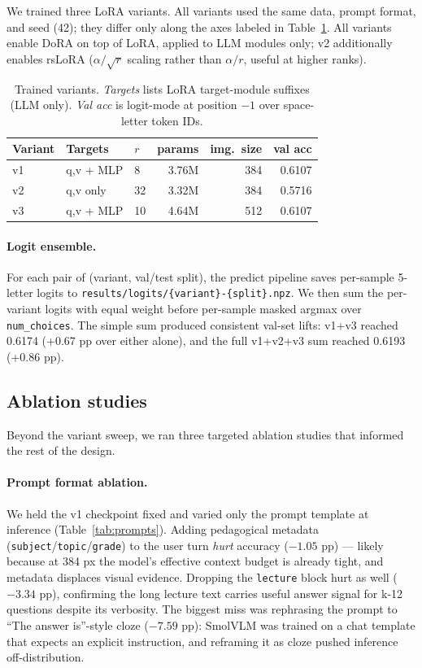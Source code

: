\documentclass[11pt]{article}
\begin{document}
We trained three LoRA variants. All variants used the same data, prompt format, and seed (42); they differ only along the axes labeled in Table~\ref{tab:variants}. All variants enable DoRA on top of LoRA, applied to LLM modules only; v2 additionally enables rsLoRA ($\alpha/\sqrt{r}$ scaling rather than $\alpha/r$, useful at higher ranks).

\begin{table}[h]
\centering
\small
\begin{tabular}{lllrrr}
\toprule
Variant & Targets & $r$ & params & img.\ size & val acc \\
\midrule
v1 & q,v + MLP & 8  & 3.76M & 384 & 0.6107 \\
v2 & q,v only  & 32 & 3.32M & 384 & 0.5716 \\
v3 & q,v + MLP & 10 & 4.64M & 512 & 0.6107 \\
\bottomrule
\end{tabular}
\caption{Trained variants. \textit{Targets} lists LoRA target-module suffixes (LLM only). \textit{Val acc} is logit-mode at position $-1$ over space-letter token IDs.}
\label{tab:variants}
\end{table}

\paragraph{Logit ensemble.} For each pair of (variant, val/test split), the predict pipeline saves per-sample 5-letter logits to \texttt{results/logits/}\allowbreak\texttt{\{variant\}-\{split\}.npz}. We then sum the per-variant logits with equal weight before per-sample masked argmax over \texttt{num\_choices}. The simple sum produced consistent val-set lifts: v1+v3 reached 0.6174 (+0.67 pp over either alone), and the full v1+v2+v3 sum reached 0.6193 (+0.86 pp).

\subsection{Ablation studies}
\label{sec:ablations}

Beyond the variant sweep, we ran three targeted ablation studies that informed the rest of the design.

\paragraph{Prompt format ablation.} We held the v1 checkpoint fixed and varied only the prompt template at inference (Table~\ref{tab:prompts}). Adding pedagogical metadata (\texttt{subject}/\texttt{topic}/\texttt{grade}) to the user turn \textit{hurt} accuracy ($-1.05$ pp) --- likely because at 384 px the model's effective context budget is already tight, and metadata displaces visual evidence. Dropping the \texttt{lecture} block hurt as well ($-3.34$ pp), confirming the long lecture text carries useful answer signal for k-12 questions despite its verbosity. The biggest miss was rephrasing the prompt to ``The answer is''-style cloze ($-7.59$ pp): SmolVLM was trained on a chat template that expects an explicit instruction, and reframing it as cloze pushed inference off-distribution.
\end{document}
